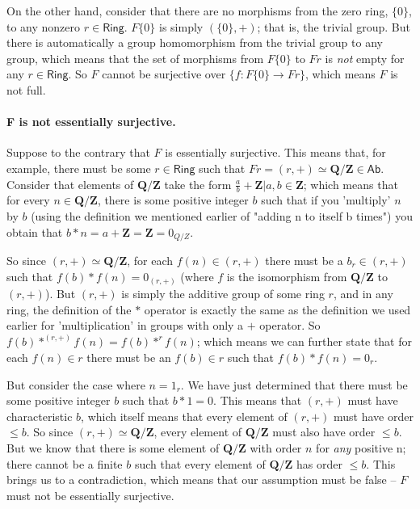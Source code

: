 \documentclass[main.tex]{subfiles}
\begin{document}
On the other hand, consider that there are no morphisms from the zero ring, \(\{0\}\), to any nonzero \(r \in \textsf{Ring}\). \(F\{0\}\) is simply \((\{0\}, +)\); that is, the trivial group. But there is automatically a group homomorphism from the trivial group to any group, which means that the set of morphisms from \(F\{0\}\) to \(Fr\) is \textit{not} empty for any \(r \in \textsf{Ring}\). So \(F\) cannot be surjective over \(\{f : F\{0\} \to Fr\}\), which means \(F\) is not full.

\paragraph{F is not essentially surjective.}	

Suppose to the contrary that \(F\) is essentially surjective. This means that, for example, there must be some \(r \in \textsf{Ring}\) such that \(Fr = (r, +) \simeq \textbf{Q/Z} \in \textsf{Ab}\). Consider that elements of \(\textbf{Q/Z}\) take the form \(\frac{a}{b} + \textbf{Z} | a, b \in \textbf{Z}\); which means that for every \(n \in \textbf{Q/Z}\), there is some positive integer \(b\) such that if you 'multiply' \(n\) by \(b\) (using the definition we mentioned earlier of "adding n to itself b times") you obtain that \(b*n = a + \textbf{Z} = \textbf{Z} = 0_{Q/Z}\).

So since \((r, +) \simeq \textbf{Q/Z}\), for each \(f(n) \in (r, +)\) there must be a \(b_r \in (r, +)\) such that \(f(b)*f(n) = 0_{(r, +)}\) (where \(f\) is the isomorphism from \(\textbf{Q/Z}\) to \((r,+)\)). But \((r, +)\) is simply the additive group of some ring \(r\), and in any ring, the definition of the \(*\) operator is exactly the same as the definition we used earlier for 'multiplication' in groups with only a \(+\) operator. So \(f(b)*^{(r,+)}f(n) = f(b)*^rf(n)\); which means we can further state that for each \(f(n) \in r\) there must be an \(f(b) \in r\) such that \(f(b)*f(n) = 0_r\).

But consider the case where \(n = 1_r\). We have just determined that there must be some positive integer \(b\) such that \(b*1 = 0\). This means that \((r, +)\) must have characteristic \(b\), which itself means that every element of \((r, +)\) must have order \(\leq b\). So since \((r, +) \simeq \textbf{Q/Z}\), every element of \(\textbf{Q/Z}\) must also have order \(\leq b\). But we know that there is some element of \(\textbf{Q/Z}\) with order \(n\) for \textit{any} positive n; there cannot be a finite \(b\) such that every element of \(\textbf{Q/Z}\) has order \(\leq b\). This brings us to a contradiction, which means that our assumption must be false -- \(F\) must not be essentially surjective.
\end{document}
